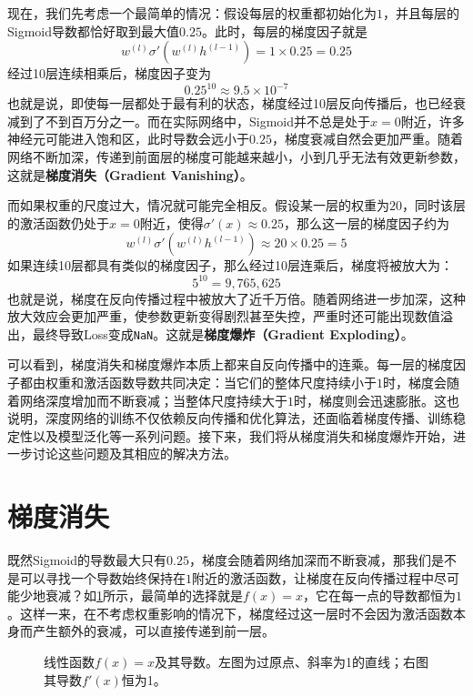 现在，我们先考虑一个最简单的情况：假设每层的权重都初始化为$1$，并且每层的Sigmoid导数都恰好取到最大值$0.25$。此时，每层的梯度因子就是
$$
w^{(l)}\sigma'\left(w^{(l)}h^{(l-1)}\right) = 1\times0.25 = 0.25
$$
经过10层连续相乘后，梯度因子变为
$$
0.25^{10} \approx 9.5\times10^{-7}
$$
也就是说，即使每一层都处于最有利的状态，梯度经过10层反向传播后，也已经衰减到了不到百万分之一。而在实际网络中，Sigmoid并不总是处于$x=0$附近，许多神经元可能进入饱和区，此时导数会远小于$0.25$，梯度衰减自然会更加严重。随着网络不断加深，传递到前面层的梯度可能越来越小，小到几乎无法有效更新参数，这就是\textbf{梯度消失（Gradient Vanishing）}。

而如果权重的尺度过大，情况就可能完全相反。假设某一层的权重为$20$，同时该层的激活函数仍处于$x=0$附近，使得$\sigma'(x)\approx0.25$，那么这一层的梯度因子约为
$$
w^{(l)}\sigma'\left(w^{(l)}h^{(l-1)}\right) \approx 20\times0.25 = 5
$$
如果连续10层都具有类似的梯度因子，那么经过10层连乘后，梯度将被放大为：
$$
5^{10}=9,765,625
$$
也就是说，梯度在反向传播过程中被放大了近千万倍。随着网络进一步加深，这种放大效应会更加严重，使参数更新变得剧烈甚至失控，严重时还可能出现数值溢出，最终导致Loss变成\texttt{NaN}。这就是\textbf{梯度爆炸（Gradient Exploding）}。

可以看到，梯度消失和梯度爆炸本质上都来自反向传播中的连乘。每一层的梯度因子都由权重和激活函数导数共同决定：当它们的整体尺度持续小于$1$时，梯度会随着网络深度增加而不断衰减；当整体尺度持续大于$1$时，梯度则会迅速膨胀。这也说明，深度网络的训练不仅依赖反向传播和优化算法，还面临着梯度传播、训练稳定性以及模型泛化等一系列问题。接下来，我们将从梯度消失和梯度爆炸开始，进一步讨论这些问题及其相应的解决方法。

\section{梯度消失}

既然Sigmoid的导数最大只有$0.25$，梯度会随着网络加深而不断衰减，那我们是不是可以寻找一个导数始终保持在$1$附近的激活函数，让梯度在反向传播过程中尽可能少地衰减？如\cref{fig:x}所示，最简单的选择就是$f(x)=x$，它在每一点的导数都恒为$1$。这样一来，在不考虑权重影响的情况下，梯度经过这一层时不会因为激活函数本身而产生额外的衰减，可以直接传递到前一层。

\begin{figure}[H]
    \caption{线性函数$f(x)=x$及其导数。左图为过原点、斜率为1的直线；右图其导数$f'(x)$恒为1。}
    \label{fig:x}
\end{figure}

